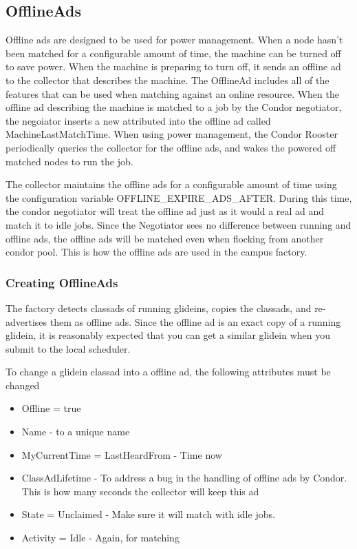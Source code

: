 \documentclass[11pt]{article}
\begin{document}
\subsection{OfflineAds}
Offline ads are designed to be used for power management. When a node hasn't been matched for a configurable amount of time, the machine can be turned off to save power. When the machine is preparing to turn off, it sends an offline ad to the collector that describes the machine. The OfflineAd includes all of the features that can be used when matching against an online resource.  When the offline ad describing the machine is matched to a job by the Condor negotiator, the negoiator inserts a new attributed into the offline ad called MachineLastMatchTime.  When using power management, the Condor Rooster periodically queries the collector for the offline ads, and wakes the powered off matched nodes to run the job.

The collector maintains the offline ads for a configurable amount of time using the configuration variable OFFLINE\_EXPIRE\_ADS\_AFTER. During this time, the condor negotiator will treat the offline ad just as it would a real ad and match it to idle jobs. Since the Negotiator sees no difference between running and offline ads, the offline ads will be matched even when flocking from another condor pool.  This is how the offline ads are used in the campus factory.

\subsubsection{Creating OfflineAds}
The factory detects classads of running glideins, copies the classads, and re-advertises them as offline ads. Since the offline ad is an exact copy of a running glidein, it is reasonably expected that you can get a similar glidein when you submit to the local scheduler.

To change a glidein classad into a offline ad, the following attributes must be changed

\begin{itemize}
\item Offline = true
\item Name - to a unique name
\item MyCurrentTime = LastHeardFrom - Time now
\item ClassAdLifetime - To address a bug in the handling of offline ads by Condor. This is how many seconds the collector will keep this ad
\item State = Unclaimed - Make sure it will match with idle jobs.
\item Activity = Idle - Again, for matching 
\end{itemize}
\end{document}
